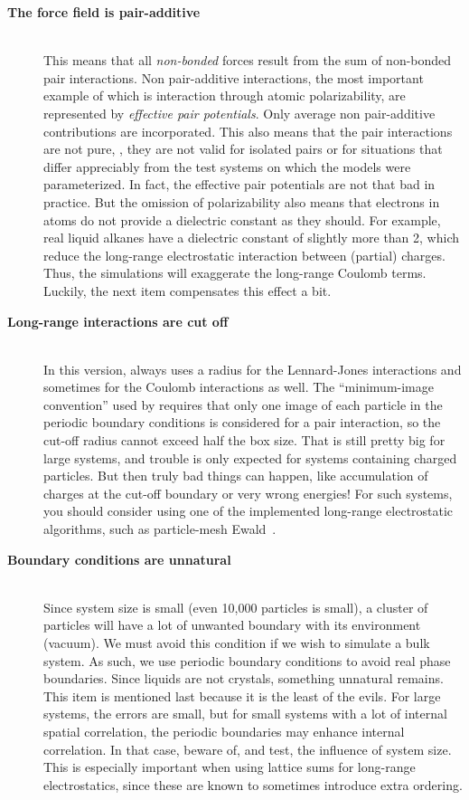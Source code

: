\begin{description}
\item[{\bf The force field is pair-additive}]\mbox{}\\
This means that all {\em non-bonded} forces result from the sum of
non-bonded pair interactions. Non pair-additive interactions, the most
important example of which is interaction through atomic
polarizability, are represented by {\em effective pair
potentials}. Only average non pair-additive contributions are
incorporated. This also means that the pair interactions are not pure,
{\ie}, they are not valid for isolated pairs or for situations
that differ appreciably from the test systems on which the models were
parameterized. In fact, the effective pair potentials are not that bad
in practice. But the omission of polarizability also means that
electrons in atoms do not provide a dielectric constant as they
should. For example, real liquid alkanes have a dielectric constant of
slightly more than 2, which reduce the long-range electrostatic
interaction between (partial) charges. Thus, the simulations will
exaggerate the long-range Coulomb terms. Luckily, the next item
compensates this effect a bit.

\item[{\bf Long-range interactions are cut off}]\mbox{}\\
In this version, {\gromacs} always uses a  radius for the
Lennard-Jones interactions and sometimes for the Coulomb interactions
as well. The ``minimum-image convention'' used by {\gromacs} requires that only one image of each
particle in the periodic boundary conditions is considered for a pair
interaction, so the cut-off radius cannot exceed half the box size. That
is still pretty big for large systems, and trouble is only expected
for systems containing charged particles. But then truly bad things can
happen, like accumulation of charges at the cut-off boundary or very
wrong energies! For such systems, you should consider using one of the
implemented long-range electrostatic algorithms, such as 
particle-mesh Ewald~\cite{Darden93,Essmann95}.

\item[{\bf Boundary conditions are unnatural}]\mbox{}\\
Since system size is small (even 10,000 particles is small), a cluster
of particles will have a lot of unwanted boundary with its environment
(vacuum). We must avoid this condition if we wish to simulate a bulk system.
As such, we use periodic boundary conditions to avoid real phase
boundaries. Since liquids are not crystals, something unnatural
remains. This item is mentioned last because it is the
least of the evils. For large systems, the errors are small, but for
small systems with a lot of internal spatial correlation, the periodic
boundaries may enhance internal correlation. In that case, beware of, and
test, the influence of system size. This is especially important when
using lattice sums for long-range electrostatics, since these are known
to sometimes introduce extra ordering.
\end{description}

